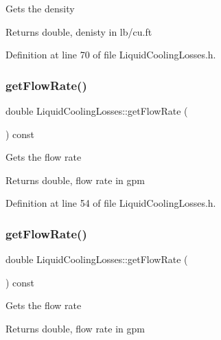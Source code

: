 Gets the density \begin{DoxyReturn}{Returns}
double, denisty in lb/cu.\+ft 
\end{DoxyReturn}


Definition at line 70 of file Liquid\+Cooling\+Losses.\+h.

\mbox{\label{class_liquid_cooling_losses_acb4a68199bdc5f0597d1feadc3ecdb2c}} 
\subsubsection{\texorpdfstring{get\+Flow\+Rate()}{getFlowRate()}\hspace{0.1cm}{\footnotesize\ttfamily [1/3]}}
{\footnotesize\ttfamily double Liquid\+Cooling\+Losses\+::get\+Flow\+Rate (\begin{DoxyParamCaption}{ }\end{DoxyParamCaption}) const\hspace{0.3cm}{\ttfamily [inline]}}

Gets the flow rate \begin{DoxyReturn}{Returns}
double, flow rate in gpm 
\end{DoxyReturn}


Definition at line 54 of file Liquid\+Cooling\+Losses.\+h.

\mbox{\label{class_liquid_cooling_losses_acb4a68199bdc5f0597d1feadc3ecdb2c}} 
\subsubsection{\texorpdfstring{get\+Flow\+Rate()}{getFlowRate()}\hspace{0.1cm}{\footnotesize\ttfamily [2/3]}}
{\footnotesize\ttfamily double Liquid\+Cooling\+Losses\+::get\+Flow\+Rate (\begin{DoxyParamCaption}{ }\end{DoxyParamCaption}) const\hspace{0.3cm}{\ttfamily [inline]}}

Gets the flow rate \begin{DoxyReturn}{Returns}
double, flow rate in gpm 
\end{DoxyReturn}


